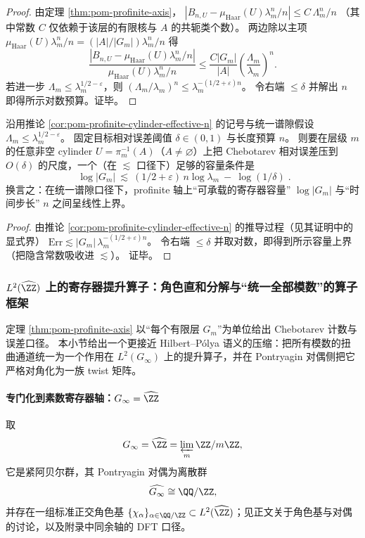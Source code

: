 \begin{proof}
由定理 \ref{thm:pom-profinite-axis}，
\(
|B_{n,U}-\mu_{\mathrm{Haar}}(U)\lambda_m^n/n|\le C\,\Lambda_m^n/n
\)
（其中常数 \(C\) 仅依赖于该层的有限核与 \(A\) 的共轭类个数）。
两边除以主项 \(\mu_{\mathrm{Haar}}(U)\lambda_m^n/n=(|A|/|G_m|)\lambda_m^n/n\) 得
\[
\frac{|B_{n,U}-\mu_{\mathrm{Haar}}(U)\lambda_m^n/n|}{\mu_{\mathrm{Haar}}(U)\lambda_m^n/n}
\le
\frac{C|G_m|}{|A|}\left(\frac{\Lambda_m}{\lambda_m}\right)^n.
\]
若进一步 \(\Lambda_m\le \lambda_m^{1/2-\varepsilon}\)，则 \((\Lambda_m/\lambda_m)^n\le \lambda_m^{-(1/2+\varepsilon)n}\)。
令右端 \(\le \delta\) 并解出 \(n\) 即得所示对数预算。证毕。
\end{proof}

\begin{corollary}\label{cor:pom-profinite-cylinder-capacity}
沿用推论 \ref{cor:pom-profinite-cylinder-effective-n} 的记号与统一谱隙假设
\(
\Lambda_m\le \lambda_m^{1/2-\varepsilon}
\)。
固定目标相对误差阈值 \(\delta\in(0,1)\) 与长度预算 \(n\)。
则要在层级 \(m\) 的任意非空 cylinder \(U=\pi_m^{-1}(A)\)（\(A\neq\varnothing\)）上把 Chebotarev 相对误差压到 \(O(\delta)\) 的尺度，一个（在 \(\lesssim\) 口径下）足够的容量条件是
\[
\boxed{\;
\log |G_m|\ \lesssim\ (1/2+\varepsilon)\,n\log\lambda_m\ -\ \log(1/\delta)\; }.
\]
换言之：在统一谱隙口径下，profinite 轴上“可承载的寄存器容量” \(\log|G_m|\) 与“时间步长” \(n\) 之间呈线性上界。
\end{corollary}
\begin{proof}
由推论 \ref{cor:pom-profinite-cylinder-effective-n} 的推导过程（见其证明中的显式界）
\(
\mathrm{Err}\lesssim |G_m|\,\lambda_m^{-(1/2+\varepsilon)n}
\)。
令右端 \(\le \delta\) 并取对数，即得到所示容量上界（把隐含常数吸收进 \(\lesssim\)）。
证毕。
\end{proof}

\subsubsection{\texorpdfstring{$L^2(\widehat{\ZZ})$}{L2(Zhat)} 上的寄存器提升算子：角色直和分解与“统一全部模数”的算子框架}\label{subsec:profinite-operator-l2}
定理 \ref{thm:pom-profinite-axis} 以“每个有限层 \(G_m\)”为单位给出 Chebotarev 计数与误差口径。
本小节给出一个更接近 Hilbert--P{\'o}lya 语义的压缩：把所有模数的扭曲通道统一为一个作用在 \(L^2(G_\infty)\) 上的提升算子，并在 Pontryagin 对偶侧把它严格对角化为一族 twist 矩阵。

\paragraph{专门化到素数寄存器轴：\texorpdfstring{$G_\infty=\widehat{\ZZ}$}{G=Zhat}}
取
\[
G_\infty=\widehat{\ZZ}=\varprojlim_m \ZZ/m\ZZ,
\]
它是紧阿贝尔群，其 Pontryagin 对偶为离散群
\[
\widehat{G_\infty}\cong \QQ/\ZZ,
\]
并存在一组标准正交角色基 \(\{\chi_\alpha\}_{\alpha\in\QQ/\ZZ}\subset L^2(\widehat{\ZZ})\)；见正文关于角色基与对偶的讨论，以及附录中同余轴的 DFT 口径。

